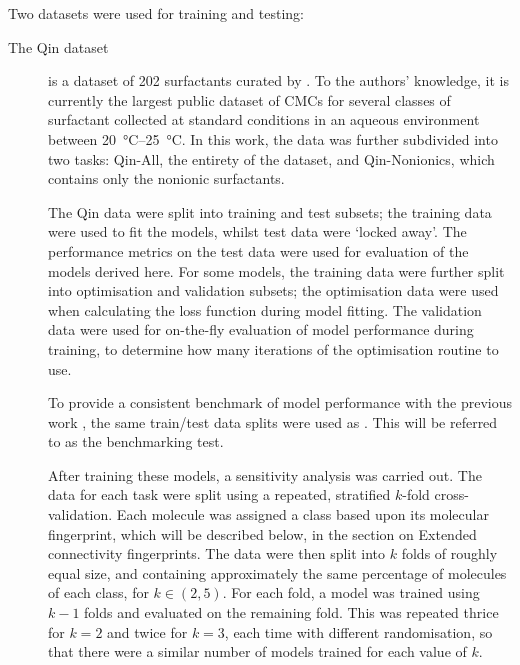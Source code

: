 \newcommand{\lrv}{\vec{v}^{\,(p)}}

Two datasets were used for training and testing:

\begin{description}
    \item[The Qin dataset] is a dataset of 202 surfactants curated by
          \citet{qinPredictingCriticalMicelle2021}. To the authors' knowledge,
          it is currently the largest public dataset of CMCs for several classes
          of surfactant collected at standard conditions in an aqueous
          environment between \SIrange{20}{25}{\celsius}. In this work, the data
          was further subdivided into two tasks: Qin-All, the entirety of the
          dataset, and Qin-Nonionics, which contains only the nonionic
          surfactants.

          The Qin data were split into training and test subsets; the training
          data were used to fit the models, whilst test data were `locked away'.
          The performance metrics on the test data were used for evaluation of
          the models derived here. For some models, the training data were
          further split into optimisation and validation subsets; the
          optimisation data were used when calculating the loss function during
          model fitting. The validation data were used for on-the-fly evaluation
          of model performance during training, to determine how many iterations
          of the optimisation routine to use.

          To provide a consistent benchmark of model performance with
          the previous work \cite{qinPredictingCriticalMicelle2021}, the same
          train/test data splits were used as
          \citet{qinPredictingCriticalMicelle2021}. This will be referred to as
          the benchmarking test.

          After training these models, a sensitivity analysis was carried out.
          The data for each task were split using a repeated, stratified
          $k$-fold cross-validation. Each molecule was assigned a class based
          upon its molecular fingerprint, which will be described below, in the
          section on Extended connectivity fingerprints. The data were then
          split into $k$ folds of roughly equal size, and containing
          approximately the same percentage of molecules of each class, for $k
          \in (2, 5)$. For each fold, a model was trained using $k-1$ folds and
          evaluated on the remaining fold. This was repeated thrice for $k = 2$
          and twice for $k = 3$, each time with different randomisation, so that
          there were a similar number of models trained for each value of $k$.


\end{description}

